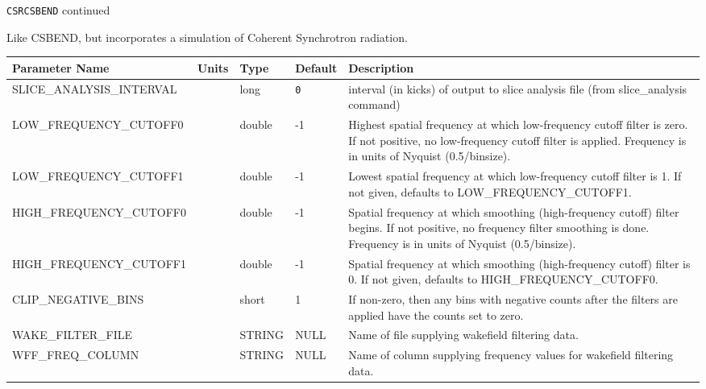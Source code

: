 \newpage
\begin{center}{\Large\verb|CSRCSBEND| continued}\end{center}
Like CSBEND, but incorporates a simulation of Coherent Synchrotron radiation.
\\
\begin{tabular}{|l|l|l|l|p{\descwidth}|} \hline
Parameter Name & Units & Type & Default & Description \\ \hline 
SLICE\_ANALYSIS\_INTERVAL &  & long &  \verb|0| & interval (in kicks) of output to slice analysis file (from slice\_analysis command)  \\ \hline 
LOW\_FREQUENCY\_CUTOFF0 &  & double &   -1 & Highest spatial frequency at which low-frequency cutoff filter is zero.  If not positive, no low-frequency cutoff filter is applied. Frequency is in units of Nyquist (0.5/binsize).  \\ \hline 
LOW\_FREQUENCY\_CUTOFF1 &  & double &   -1 & Lowest spatial frequency at which low-frequency cutoff filter is 1.  If not given, defaults to LOW\_FREQUENCY\_CUTOFF1.  \\ \hline 
HIGH\_FREQUENCY\_CUTOFF0 &  & double &   -1 & Spatial frequency at which smoothing (high-frequency cutoff) filter begins.  If not positive, no frequency filter smoothing is done.  Frequency is in units of Nyquist (0.5/binsize).  \\ \hline 
HIGH\_FREQUENCY\_CUTOFF1 &  & double &   -1 & Spatial frequency at which smoothing (high-frequency cutoff) filter is 0.  If not given, defaults to HIGH\_FREQUENCY\_CUTOFF0.  \\ \hline 
CLIP\_NEGATIVE\_BINS &  & short &   1               & If non-zero, then any bins with negative counts after the filters are applied have the counts set to zero.  \\ \hline 
WAKE\_FILTER\_FILE &  & STRING &   NULL            & Name of file supplying wakefield filtering data.  \\ \hline 
WFF\_FREQ\_COLUMN &  & STRING &   NULL            & Name of column supplying frequency values for wakefield filtering data.  \\ \hline 
\end{tabular}

